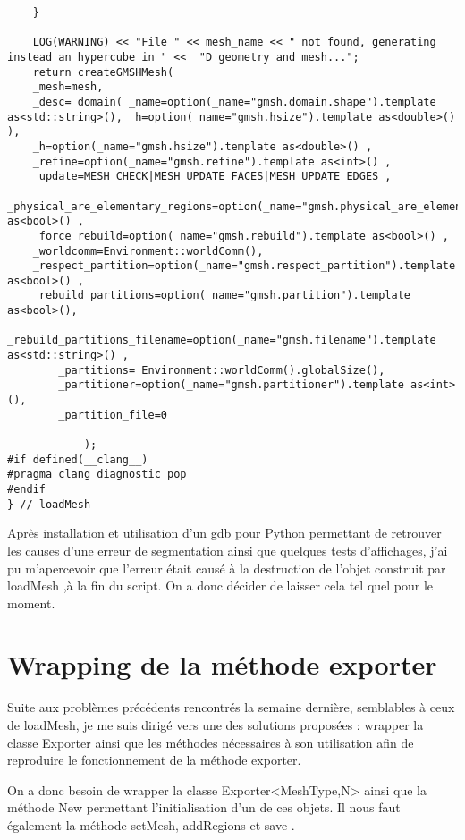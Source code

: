 \documentclass[12pt]{article}
\begin{document}
\begin{lstlisting}
    }

    LOG(WARNING) << "File " << mesh_name << " not found, generating instead an hypercube in " <<  "D geometry and mesh...";
    return createGMSHMesh(
    _mesh=mesh,
    _desc= domain( _name=option(_name="gmsh.domain.shape").template as<std::string>(), _h=option(_name="gmsh.hsize").template as<double>()  ),
    _h=option(_name="gmsh.hsize").template as<double>() ,
    _refine=option(_name="gmsh.refine").template as<int>() ,
    _update=MESH_CHECK|MESH_UPDATE_FACES|MESH_UPDATE_EDGES ,
    _physical_are_elementary_regions=option(_name="gmsh.physical_are_elementary_regions").template as<bool>() ,
    _force_rebuild=option(_name="gmsh.rebuild").template as<bool>() ,
    _worldcomm=Environment::worldComm(),
    _respect_partition=option(_name="gmsh.respect_partition").template as<bool>() ,
    _rebuild_partitions=option(_name="gmsh.partition").template as<bool>(),
    _rebuild_partitions_filename=option(_name="gmsh.filename").template as<std::string>() ,
        _partitions= Environment::worldComm().globalSize(),
        _partitioner=option(_name="gmsh.partitioner").template as<int>(),
        _partition_file=0   

            );
#if defined(__clang__)
#pragma clang diagnostic pop
#endif
} // loadMesh
\end{lstlisting}
\vspace{0.5 cm}

Après installation et utilisation d'un gdb pour Python permettant de retrouver les causes d'une erreur de segmentation ainsi que quelques tests d'affichages, j'ai pu m'apercevoir que l'erreur était causé à la destruction de l'objet construit par loadMesh ,à la fin du script.
On a donc décider de laisser cela tel quel pour le moment.

\section{Wrapping de la méthode exporter }

Suite aux problèmes précédents rencontrés la semaine dernière, semblables à ceux de loadMesh, je me suis dirigé vers une des solutions proposées : wrapper la classe Exporter ainsi que les méthodes nécessaires à son utilisation afin de reproduire le fonctionnement de la méthode exporter.
\vspace{0.5 cm}

On a donc besoin de wrapper la classe Exporter<MeshType,N> ainsi que la méthode New permettant l'initialisation d'un de ces objets. Il nous faut également la méthode setMesh, addRegions et save .
\vspace{0.5 cm}
\end{document}
